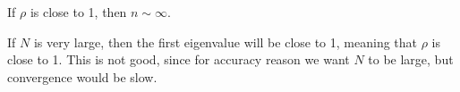 \documentclass[../main/main.tex]{subfiles}
\begin{document}
\begin{remark}
    If $\rho$ is close to 1, then $n\sim \infty$.
\end{remark}
\begin{remark}
    If $N$ is very large, then  the first eigenvalue will be close to 1, meaning that  $\rho $ is close to 1. This is not good, since for accuracy reason we want  $N$ to be large, but convergence would be slow. 
\end{remark}
\end{document}
